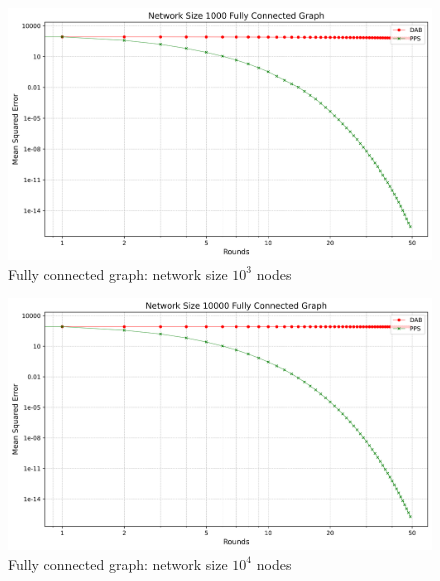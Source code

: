 \begin{figure}[H]
    \centering
    \includegraphics[scale=0.5]{figures/completeGraphSimulations/DAB_vs_PPS_FCG_r50_n1000.png}
    \caption{Fully connected graph: network size $10^{3}$ nodes}
    \label{fig:1000CompleteGraph}
\end{figure}
\begin{figure}[H]
    \centering
    \includegraphics[scale=0.5]{figures/completeGraphSimulations/DAB_vs_PPS_FCG_r50_n10000.png}
    \caption{Fully connected graph: network size $10^{4}$ nodes}
    \label{fig:10000CompleteGraph}
\end{figure}

